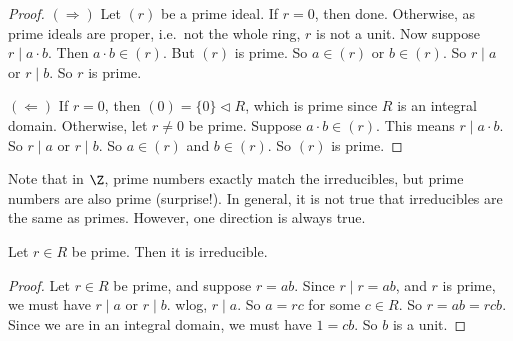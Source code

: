 \documentclass[a4paper]{article}
\begin{document}
\begin{proof}
  $(\Rightarrow)$ Let $(r)$ be a prime ideal. If $r = 0$, then done. Otherwise, as prime ideals are proper, i.e.\ not the whole ring, $r$ is not a unit. Now suppose $r \mid a \cdot b$. Then $a\cdot b \in (r)$. But $(r)$ is prime. So $a \in (r)$ or $b\in (r)$. So $r \mid a$ or $r \mid b$. So $r$ is prime.

  $(\Leftarrow)$ If $r = 0$, then $(0) = \{0\} \lhd R$, which is prime since $R$ is an integral domain. Otherwise, let $r \not= 0$ be prime. Suppose $a \cdot b \in (r)$. This means $r \mid a\cdot b$. So $r\mid a$ or $r \mid b$. So $a \in (r)$ and $b\in (r)$. So $(r)$ is prime.
\end{proof}

Note that in $\Z$, prime numbers exactly match the irreducibles, but prime numbers are also prime (surprise!). In general, it is not true that irreducibles are the same as primes. However, one direction is always true.

\begin{lemma}
  Let $r \in R$ be prime. Then it is irreducible.
\end{lemma}

\begin{proof}
  Let $r \in R$ be prime, and suppose $r = ab$. Since $r \mid r = ab$, and $r$ is prime, we must have $r \mid a$ or $r \mid b$. wlog, $r\mid a$. So $a = rc$ for some $c \in R$. So $r = ab = rcb$. Since we are in an integral domain, we must have $1 = cb$. So $b$ is a unit.
\end{proof}
\end{document}
